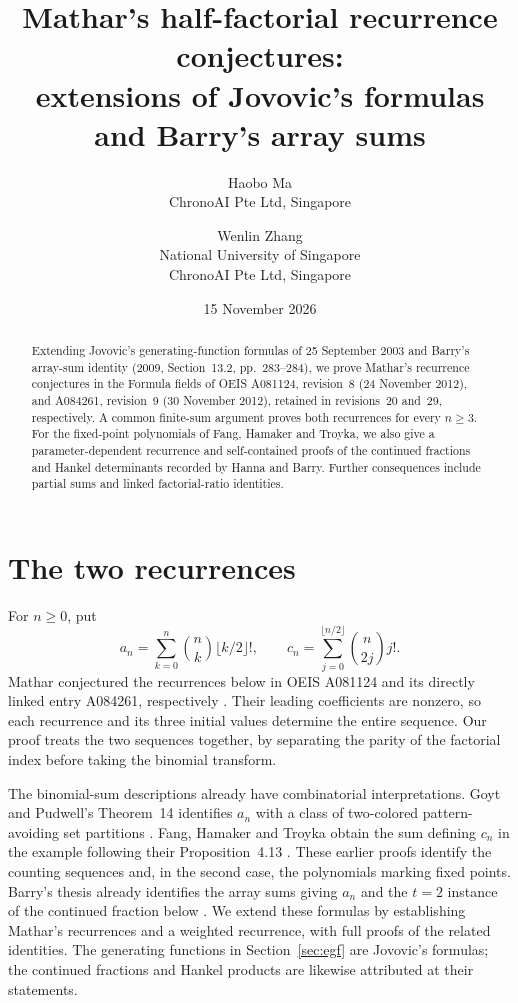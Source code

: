 \documentclass[11pt]{article}
\title{Mathar's half-factorial recurrence conjectures:\\
extensions of Jovovic's formulas and Barry's array sums}
\author{Haobo Ma\\
  \small ChronoAI Pte Ltd, Singapore
  \and Wenlin Zhang\\
  \small National University of Singapore\\
  \small ChronoAI Pte Ltd, Singapore}
\date{15 November 2026}
\begin{document}
\maketitle
\begin{abstract}
Extending Jovovic's generating-function formulas of 25 September 2003
and Barry's array-sum identity (2009, Section~13.2, pp.~283--284),
we prove Mathar's recurrence conjectures in the Formula fields of
OEIS A081124, revision~8 (24 November 2012), and A084261, revision~9
(30 November 2012), retained in revisions~20 and~29, respectively.
A common finite-sum argument proves both recurrences
for every $n\geq3$. For the fixed-point polynomials of Fang, Hamaker and
Troyka, we also give a parameter-dependent recurrence and self-contained
proofs of the continued fractions and Hankel determinants recorded by
Hanna and Barry. Further consequences include partial sums and linked
factorial-ratio identities.
\end{abstract}

\section{The two recurrences}
For $n\geq0$, put
\[
 a_n=\sum_{k=0}^{n}\binom nk\lfloor k/2\rfloor!,\qquad
 c_n=\sum_{j=0}^{\lfloor n/2\rfloor}\binom n{2j}j!.
\]
Mathar conjectured the recurrences below in OEIS
A081124 and its directly linked entry A084261, respectively
\cite{oeis-a,oeis-c}. Their leading coefficients are nonzero, so each
recurrence and its three initial values determine the entire sequence.
Our proof treats the two sequences together, by separating the parity
of the factorial index before taking the binomial transform.

The binomial-sum descriptions already have combinatorial interpretations.
Goyt and Pudwell's Theorem~14 identifies $a_n$ with a class of
two-colored pattern-avoiding set partitions \cite[Section~4.5, p.~13]{gp}.
Fang, Hamaker and Troyka obtain the sum defining $c_n$ in the example
following their Proposition~4.13 \cite[Section~4.3, p.~16]{fht}.
These earlier proofs identify the counting sequences and, in the second
case, the polynomials marking fixed points. Barry's thesis already
identifies the array sums giving $a_n$
\cite[Section~13.2, pp.~283--284]{barry-thesis} and the $t=2$ instance
of the continued fraction below \cite[Example~64, pp.~53--54]{barry-thesis}.
We extend these formulas by establishing Mathar's recurrences and a
weighted recurrence, with full proofs of the related identities.
The generating functions in Section~\ref{sec:egf} are Jovovic's formulas;
the continued fractions and Hankel products are likewise attributed at
their statements.
\end{document}
